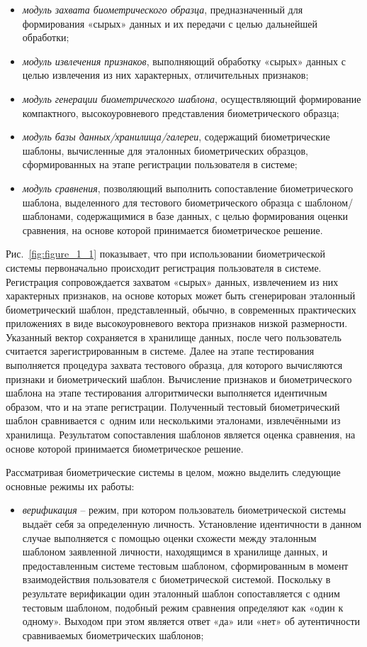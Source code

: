 \documentclass[12pt]{book}
\begin{document}
{\begin{itemize}[topsep=1pt] \itemsep0.1em
\item \textit{модуль захвата биометрического образца}, предназначенный для формирования «сырых» данных и их передачи с целью дальнейшей обработки;
\item \textit{модуль извлечения признаков}, выполняющий обработку «сырых» данных с целью извлечения из них характерных, отличительных признаков;
\item \textit{модуль генерации биометрического шаблона}, осуществляющий формирование компактного, высокоуровневого представления биометрического образца;
\item \textit{модуль базы данных/хранилища/галереи}, содержащий биометрические шаблоны, вычисленные для эталонных биометрических образцов, сформированных на этапе регистрации пользователя в системе;
\item \textit{модуль сравнения}, позволяющий выполнить сопоставление биометрического шаблона, выделенного для тестового биометрического образца с шаблоном/шаблонами, содержащимися в базе данных, с целью формирования оценки сравнения, на основе которой принимается биометрическое решение.
\end{itemize}

Рис.~\ref{fig:figure_1_1} показывает, что при использовании биометрической системы первоначально происходит регистрация пользователя в системе. Регистрация сопровождается захватом «сырых» данных, извлечением из них характерных признаков, на основе которых может быть сгенерирован эталонный биометрический шаблон, представленный, обычно, в современных практических приложениях в виде высокоуровневого вектора признаков низкой размерности. Указанный вектор сохраняется в хранилище данных, после чего пользователь считается зарегистрированным в системе. Далее на этапе тестирования выполняется процедура захвата тестового образца, для которого вычисляются признаки и биометрический шаблон. Вычисление признаков и биометрического шаблона на этапе тестирования алгоритмически выполняется идентичным образом, что и на этапе регистрации. Полученный тестовый биометрический шаблон сравнивается с~одним или несколькими эталонами, извлечёнными из хранилища. Результатом сопоставления шаблонов является оценка сравнения, на основе которой принимается биометрическое решение.

Рассматривая биометрические системы в целом, можно выделить следующие основные режимы их работы:

\begin{itemize}[topsep=1pt] \itemsep0.1em
\item \textit{верификация} -- режим, при котором пользователь биометрической системы выдаёт себя за определенную личность. Установление идентичности в данном случае выполняется с помощью оценки схожести между эталонным шаблоном заявленной личности, находящимся в хранилище данных, и предоставленным системе тестовым шаблоном, сформированным в момент взаимодействия пользователя с биометрической системой. Поскольку в результате верификации один эталонный шаблон сопоставляется с одним тестовым шаблоном, подобный режим сравнения определяют как «один к одному». Выходом при этом является ответ «да» или «нет» об аутентичности сравниваемых биометрических шаблонов;


\end{itemize}}
\end{document}
